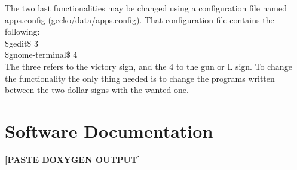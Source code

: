 \documentclass{article}
\begin{document}
The two last functionalities may be changed using a configuration file named apps.config (gecko/data/apps.config). 
That configuration file contains the following:
\\[0.5cm]
\$gedit\$ 3 \\
\$gnome-terminal\$ 4
\\[0.5cm]
The three refers to the victory sign, and the 4 to the gun or L sign. To change the functionality the only thing needed is to change the programs written between the two dollar signs with the wanted one. 


\section{Software Documentation}
\textbf{[PASTE DOXYGEN OUTPUT]}
\end{document}
